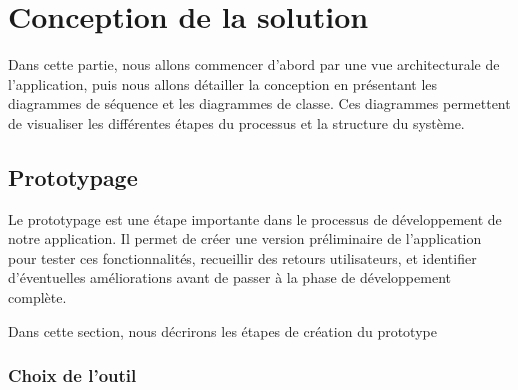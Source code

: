 \chapter{Conception de la solution}
\label{Conception de la solution}



Dans cette partie, nous allons commencer d’abord par une vue architecturale de
l’application, puis nous allons détailler la conception en présentant les
diagrammes de séquence et les diagrammes de classe. Ces diagrammes permettent de visualiser les différentes étapes du processus et la structure du système.

\pagebreak
\section{Prototypage}

Le prototypage est une étape importante dans le processus de développement de notre application. Il permet de créer une version préliminaire de
 l'application pour tester ces fonctionnalités, recueillir des retours utilisateurs, et identifier d'éventuelles améliorations avant de passer à la phase de développement complète.

 Dans cette section, nous décrirons les étapes de création du prototype

\subsection{Choix de l'outil}

